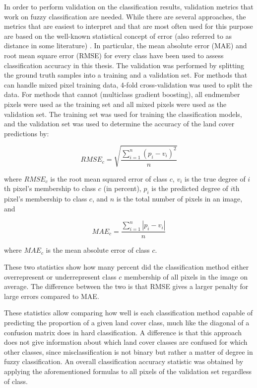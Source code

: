 \documentclass[a4paper,12pt]{scrbook}
\begin{document}
In order to perform validation on the classification results, validation metrics that work on fuzzy classification are needed. While there are several approaches, the metrics that are easiest to interpret and that are most often used for this purpose are based on the well-known statistical concept of error (also referred to as distance in some literature) \citep{foody1996fuzzyevaluation}. In particular, the mean absolute error (MAE) and root mean square error (RMSE) for every class have been used to assess classification accuracy in this thesis. The validation was performed by splitting the ground truth samples into a training and a validation set. For methods that can handle mixed pixel training data, 4-fold cross-validation was used to split the data. For methods that cannot (multiclass gradient boosting), all endmember pixels were used as the training set and all mixed pixels were used as the validation set. The training set was used for training the classification models, and the validation set was used to determine the accuracy of the land cover predictions by:

$$ RMSE_c = \sqrt{ \frac{\displaystyle\sum_{i=1}^{n}{ (p_{i} - v_{i})^2 }}{n} } $$

where $ RMSE_c $ is the root mean squared error of class $ c $, $ v_{i} $ is the true degree of $ i $th pixel's membership to class $ c $ (in percent), $ p_i $ is the predicted degree of $ i $th pixel's membership to class $ c $, and $ n $ is the total number of pixels in an image, and

$$ MAE_c = \frac{\displaystyle\sum_{i=1}^{n}{ |p_{i} - v_{i}| }}{n} $$

where $ MAE_c $ is the mean absolute error of class $ c $.

These two statistics show how many percent did the classification method either overrepresent or underrepresent class $ c $ membership of all pixels in the image on average. The difference between the two is that RMSE gives a larger penalty for large errors compared to MAE.

These statistics allow comparing how well is each classification method capable of predicting the proportion of a given land cover class, much like the diagonal of a confusion matrix does in hard classification. A difference is that this approach does not give information about which land cover classes are confused for which other classes, since misclassification is not binary but rather a matter of degree in fuzzy classification. An overall classification accuracy statistic was obtained by applying the aforementioned formulas to all pixels of the validation set regardless of class.
\end{document}
